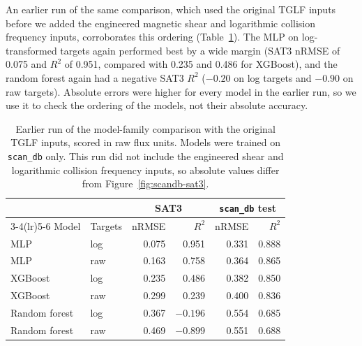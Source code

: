 \documentclass[12pt,letterpaper]{article}
\begin{document}
An earlier run of the same comparison, which used the original TGLF inputs
before we added the engineered magnetic shear and logarithmic collision
frequency inputs, corroborates this ordering (Table~\ref{tab:scandb-earlier}).
The MLP on log-transformed targets again performed best by a wide margin (SAT3
nRMSE of 0.075 and $R^2$ of 0.951, compared with 0.235 and 0.486 for XGBoost),
and the random forest again had a negative SAT3 $R^2$ ($-0.20$ on log targets
and $-0.90$ on raw targets). Absolute errors were higher for every model in the
earlier run, so we use it to check the ordering of the models, not their
absolute accuracy.

\begin{table}[htbp]
  \centering
  \caption{Earlier run of the model-family comparison with the original TGLF
    inputs, scored in raw flux units. Models were trained on \texttt{scan\_db}
    only. This run did not include the engineered shear and logarithmic
    collision frequency inputs, so absolute values differ from
    Figure~\ref{fig:scandb-sat3}.}
  \label{tab:scandb-earlier}
  \small
  \begin{tabular}{llrrrr}
    \toprule
                  &         & \multicolumn{2}{c}{SAT3} & \multicolumn{2}{c}{\texttt{scan\_db} test}                 \\
    \cmidrule(lr){3-4}\cmidrule(lr){5-6}
    Model         & Targets & nRMSE                    & $R^2$                                      & nRMSE & $R^2$ \\
    \midrule
    MLP           & log     & 0.075                    & 0.951                                      & 0.331 & 0.888 \\
    MLP           & raw     & 0.163                    & 0.758                                      & 0.364 & 0.865 \\
    XGBoost       & log     & 0.235                    & 0.486                                      & 0.382 & 0.850 \\
    XGBoost       & raw     & 0.299                    & 0.239                                      & 0.400 & 0.836 \\
    Random forest & log     & 0.367                    & $-0.196$                                   & 0.554 & 0.685 \\
    Random forest & raw     & 0.469                    & $-0.899$                                   & 0.551 & 0.688 \\
    \bottomrule
  \end{tabular}
\end{table}
\end{document}
